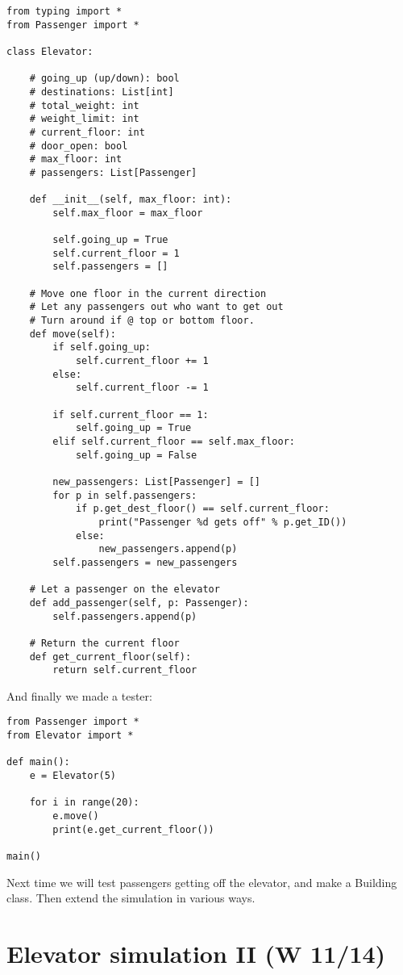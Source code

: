 \documentclass{article}
\newcommand{\notready}{\textcolor{red}{\XSolidBold}\xspace}
\begin{document}
\begin{verbatim}
from typing import *
from Passenger import *

class Elevator:

    # going_up (up/down): bool
    # destinations: List[int]
    # total_weight: int
    # weight_limit: int
    # current_floor: int
    # door_open: bool
    # max_floor: int
    # passengers: List[Passenger]

    def __init__(self, max_floor: int):
        self.max_floor = max_floor

        self.going_up = True
        self.current_floor = 1
        self.passengers = []

    # Move one floor in the current direction
    # Let any passengers out who want to get out
    # Turn around if @ top or bottom floor.
    def move(self):
        if self.going_up:
            self.current_floor += 1
        else:
            self.current_floor -= 1

        if self.current_floor == 1:
            self.going_up = True
        elif self.current_floor == self.max_floor:
            self.going_up = False

        new_passengers: List[Passenger] = []
        for p in self.passengers:
            if p.get_dest_floor() == self.current_floor:
                print("Passenger %d gets off" % p.get_ID())
            else:
                new_passengers.append(p)
        self.passengers = new_passengers

    # Let a passenger on the elevator
    def add_passenger(self, p: Passenger):
        self.passengers.append(p)

    # Return the current floor
    def get_current_floor(self):
        return self.current_floor
\end{verbatim}

And finally we made a tester:

\begin{verbatim}
from Passenger import *
from Elevator import *

def main():
    e = Elevator(5)

    for i in range(20):
        e.move()
        print(e.get_current_floor())

main()
\end{verbatim}

Next time we will test passengers getting off the elevator, and make a
Building class.  Then extend the simulation in various ways.

\newpage
\section{\notready Elevator simulation II (W 11/14)}
\end{document}

